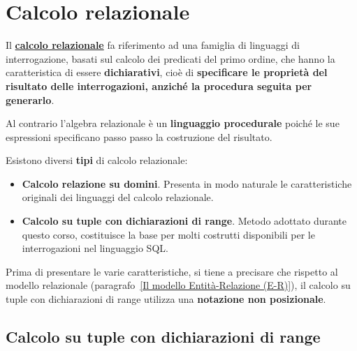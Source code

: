 \documentclass[a4paper]{article}
\begin{document}
	\section{Calcolo relazionale}
	
	Il \textcolor{Red3}{\underline{\textbf{calcolo relazionale}}} fa riferimento ad una famiglia di linguaggi di interrogazione, basati sul calcolo dei predicati del primo ordine, che hanno la caratteristica di essere \textbf{dichiarativi}, cioè di \textbf{specificare le proprietà del risultato delle interrogazioni, anziché la procedura seguita per generarlo}.
	
	Al contrario l'algebra relazionale è un \textbf{linguaggio procedurale} poiché le sue espressioni specificano passo passo la costruzione del risultato.\newline
	
	\noindent
	Esistono diversi \textbf{tipi} di calcolo relazionale:
	\begin{itemize}
		\item \textbf{Calcolo relazione su domini}. Presenta in modo naturale le caratteristiche originali dei linguaggi del calcolo relazionale.
		
		\item \textbf{Calcolo su tuple con dichiarazioni di range}. Metodo adottato durante questo corso, costituisce la base per molti costrutti disponibili per le interrogazioni nel linguaggio SQL.
	\end{itemize}
	Prima di presentare le varie caratteristiche, si tiene a precisare che rispetto al modello relazionale (paragrafo~\ref{Il modello Entità-Relazione (E-R)}), il calcolo su tuple con dichiarazioni di range utilizza una \textbf{notazione non posizionale}.\newpage
	
	\subsection{Calcolo su tuple con dichiarazioni di range}
	
\end{document}
